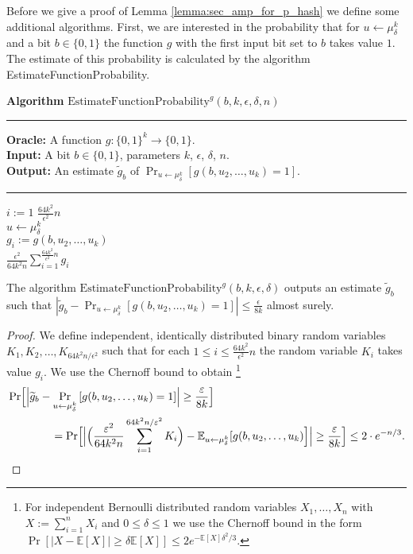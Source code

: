 Before we give a proof of Lemma \ref{lemma:sec_amp_for_p_hash} we define some additional algorithms.
First, we are interested in the probability that for $u \leftarrow \mu_{\delta}^k$ and a bit $b \in \{0,1\}$ the function $g$
with the first input bit set to $b$ takes value $1$. The estimate of this probability is calculated by the algorithm
EstimateFunctionProbability.
%
\begin{codeblock}
  \textbf{Algorithm} $\text{EstimateFunctionProbability}^{g}(b, k, \epsilon, \delta, n)$
  \medskip
  \hrule
  \medskip
  \textbf{Oracle:} A function $g : \{0,1\}^{k} \rightarrow \{0,1\}$.\\
  \textbf{Input:} A bit $b \in \{0,1\}$, parameters $k$, $\epsilon$, $\delta$, $n$. \\
  \textbf{Output:} An estimate $\widetilde{g}_b$ of $\Pr_{u \leftarrow \mu_{\delta}^{k}}[g(b,u_2, \dotsc, u_k) = 1]$.
  \medskip\hrule\medskip
  \For $i:=1$ \To $\frac{64k^2}{\epsilon^2} n$ \Do \\
  \IndI $u \leftarrow \mu_{\delta}^{k}$ \\
  \IndI $g_i := g(b, u_2, \dotsc, u_k)$ \\
  \Return $\frac{\epsilon^2}{64k^2n} \sum_{i=1}^{\frac{64k^2}{\epsilon^2} n} g_i$
\end{codeblock}
%
\begin{lemma}
  \label{lemma:estimate_of_g}
  The algorithm $\text{EstimateFunctionProbability}^{g}(b, k, \epsilon, \delta)$ outputs an estimate $\widetilde{g}_b$
  such that $| \widetilde{g}_b - \Pr_{u \leftarrow \mu_{\delta}^{k}}\left[g(b,u_2, \dots, u_k) = 1\right] | \leq \frac{\epsilon}{8k}$ almost surely.
\end{lemma}
%
\begin{proof}
We define independent, identically distributed binary random variables $K_1, K_2, \dots, K_{64k^2n/\epsilon^2}$
such that for each $1 \leq i \leq \frac{64k^2}{\epsilon^2} n$
the random variable $K_i$ takes value $g_i$. We use the Chernoff bound to obtain \footnote{For independent Bernoulli distributed
random variables $X_1, \dots, X_n$ with $X := \sum_{i=1}^n X_i$ and $0 \leq \delta \leq 1$
we use the Chernoff bound in the form $\Pr[|X - \mathbb{E}[X]| \geq \delta \mathbb{E}[X]] \leq 2 e^{- \mathbb{E}[X] \delta^2 / 3}$.}
%
\begin{align*}
  &\Pr \Bigl[ \Bigl| \widetilde{g}_b - \Pr_{u \leftarrow \mu_{\delta}^{k}}\left[g(b,u_2, \dots, u_k) = 1\right] \Bigr| \geq \frac{\varepsilon}{8k} \Bigr]\\
  &\mbox\qquad\qquad = \Pr \Bigl[\Bigl|\Bigl(\frac{\varepsilon^2}{64k^2n} \sum_{i=1}^{64k^2n / \varepsilon^2 } K_i \Bigr) - \mathbb{E}_{u \leftarrow \mu_{\delta}^k}[g(b,u_2, \dots, u_k)\Bigr]\Bigr|
    \geq \frac{\varepsilon}{8k} \Bigr] \leq 2 \cdot e^{-n/3}.
\end{align*}
\end{proof}
